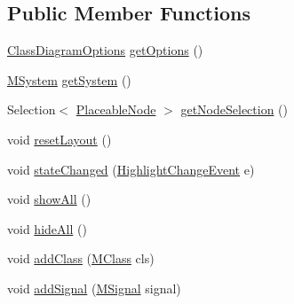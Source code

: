 \subsection*{Public Member Functions}
\begin{DoxyCompactItemize}
\item 
\hyperlink{classorg_1_1tzi_1_1use_1_1gui_1_1views_1_1diagrams_1_1classdiagram_1_1_class_diagram_options}{Class\-Diagram\-Options} \hyperlink{classorg_1_1tzi_1_1use_1_1gui_1_1views_1_1diagrams_1_1classdiagram_1_1_class_diagram_a021a3eb2afbb4a6f0a5d3859f5b825d3}{get\-Options} ()
\item 
\hyperlink{classorg_1_1tzi_1_1use_1_1uml_1_1sys_1_1_m_system}{M\-System} \hyperlink{classorg_1_1tzi_1_1use_1_1gui_1_1views_1_1diagrams_1_1classdiagram_1_1_class_diagram_afff18849223b456a8db4e98117281e1e}{get\-System} ()
\item 
Selection$<$ \hyperlink{classorg_1_1tzi_1_1use_1_1gui_1_1views_1_1diagrams_1_1elements_1_1_placeable_node}{Placeable\-Node} $>$ \hyperlink{classorg_1_1tzi_1_1use_1_1gui_1_1views_1_1diagrams_1_1classdiagram_1_1_class_diagram_ac8d73e3584743ec77c9690f246cf031c}{get\-Node\-Selection} ()
\item 
void \hyperlink{classorg_1_1tzi_1_1use_1_1gui_1_1views_1_1diagrams_1_1classdiagram_1_1_class_diagram_a40d9e7b1ddfeb2314798095344e332e6}{reset\-Layout} ()
\item 
void \hyperlink{classorg_1_1tzi_1_1use_1_1gui_1_1views_1_1diagrams_1_1classdiagram_1_1_class_diagram_af2f1a88be5a2c655a821ca515ddca3b9}{state\-Changed} (\hyperlink{classorg_1_1tzi_1_1use_1_1gui_1_1views_1_1diagrams_1_1event_1_1_highlight_change_event}{Highlight\-Change\-Event} e)
\item 
void \hyperlink{classorg_1_1tzi_1_1use_1_1gui_1_1views_1_1diagrams_1_1classdiagram_1_1_class_diagram_ab1fe4edb0c83e65f0d6e085fde277fef}{show\-All} ()
\item 
void \hyperlink{classorg_1_1tzi_1_1use_1_1gui_1_1views_1_1diagrams_1_1classdiagram_1_1_class_diagram_ac57bfdf8ddf32296d8a671deeb7d0610}{hide\-All} ()
\item 
void \hyperlink{classorg_1_1tzi_1_1use_1_1gui_1_1views_1_1diagrams_1_1classdiagram_1_1_class_diagram_aac7f33d9dee6a5e760d61cf912dc2173}{add\-Class} (\hyperlink{interfaceorg_1_1tzi_1_1use_1_1uml_1_1mm_1_1_m_class}{M\-Class} cls)
\item 
void \hyperlink{classorg_1_1tzi_1_1use_1_1gui_1_1views_1_1diagrams_1_1classdiagram_1_1_class_diagram_a9012934a3b1153182641f97bb1e38f8f}{add\-Signal} (\hyperlink{interfaceorg_1_1tzi_1_1use_1_1uml_1_1mm_1_1commonbehavior_1_1communications_1_1_m_signal}{M\-Signal} signal)

\end{DoxyCompactItemize}
